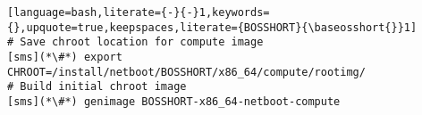\begin{lstlisting}[language=bash,literate={-}{-}1,keywords={},upquote=true,keepspaces,literate={BOSSHORT}{\baseosshort{}}1]
# Save chroot location for compute image
[sms](*\#*) export CHROOT=/install/netboot/BOSSHORT/x86_64/compute/rootimg/
# Build initial chroot image
[sms](*\#*) genimage BOSSHORT-x86_64-netboot-compute
\end{lstlisting}
